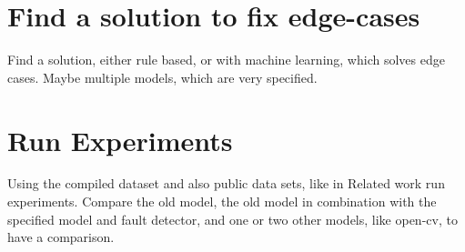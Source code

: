 \section{Find a solution to fix edge-cases}

Find a solution, either rule based, or with machine learning, which solves edge cases. Maybe multiple models, which are very specified.

\section{Run Experiments}

Using the compiled dataset and also public data sets, like in Related work run experiments. Compare the old model, the old model in combination with the specified model and fault detector, and one or two other models, like open-cv, to have a comparison.
